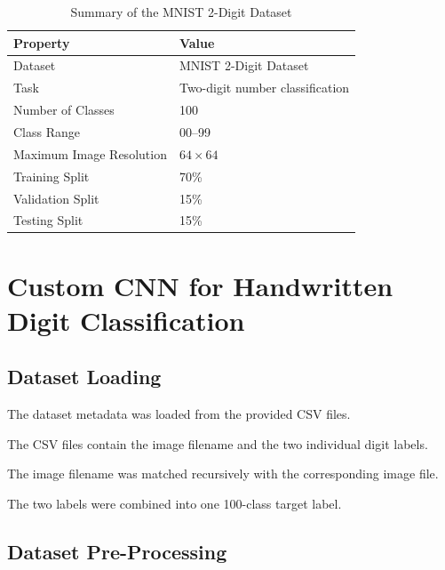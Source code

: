 \documentclass[12pt,a4paper]{report}
\begin{document}
\begin{table}[H]
\centering
\caption{Summary of the MNIST 2-Digit Dataset}
\label{tab:dataset_summary}

\begin{tabular}{ll}
\toprule
\textbf{Property} & \textbf{Value} \\
\midrule
Dataset & MNIST 2-Digit Dataset \\
Task & Two-digit number classification \\
Number of Classes & 100 \\
Class Range & 00--99 \\
Maximum Image Resolution & $64\times64$ \\
Training Split & 70\% \\
Validation Split & 15\% \\
Testing Split & 15\% \\
\bottomrule
\end{tabular}

\end{table}



\chapter{Custom CNN for Handwritten Digit Classification}

\section{Dataset Loading}

The dataset metadata was loaded from the provided CSV files.

The CSV files contain the image filename and the two individual
digit labels.

The image filename was matched recursively with the corresponding
image file.

The two labels were combined into one 100-class target label.

\section{Dataset Pre-Processing}
\end{document}
